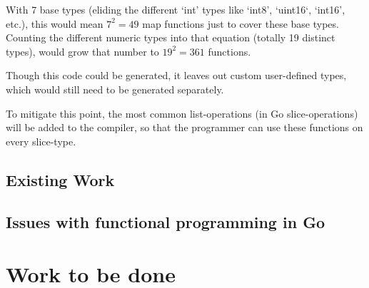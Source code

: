 With 7 base types (eliding the different `int' types like `int8', `uint16`, `int16', etc.), this would
mean $7^{2} = 49$ map functions just to cover these base types. Counting the different numeric
types into that equation (totally 19 distinct types\cite{go-basetypes}), would grow that number to $19^{2} = 361$ functions.

Though this code could be generated, it leaves out custom user-defined types, which would still
need to be generated separately.

To mitigate this point, the most common list-operations (in Go slice-operations) will be added to
the compiler, so that the programmer can use these functions on every slice-type.

\subsection{Existing Work}

\subsection{Issues with functional programming in Go}

\section{Work to be done} %
